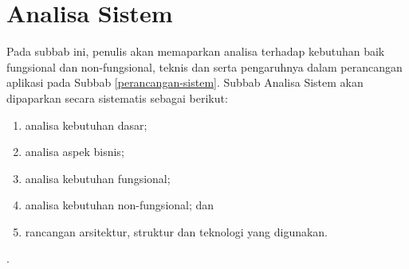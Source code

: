 \section{Analisa Sistem}
	Pada subbab ini, penulis akan memaparkan analisa terhadap kebutuhan baik fungsional dan non-fungsional, teknis dan serta pengaruhnya dalam perancangan aplikasi pada Subbab \ref{perancangan-sistem}. Subbab Analisa Sistem akan dipaparkan secara sistematis sebagai berikut:
	\begin{enumerate}[label=\alph*.]
		\item analisa kebutuhan dasar;
		\item analisa aspek bisnis;
		\item analisa kebutuhan fungsional;
		\item analisa kebutuhan non-fungsional; dan
		\item rancangan arsitektur, struktur dan teknologi yang digunakan.
	\end{enumerate}.
	
	
	
	
	
	
	
	
	
